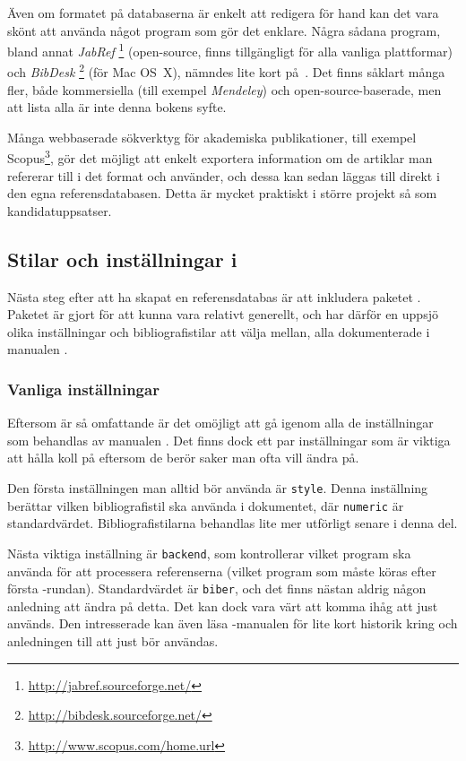 \documentclass[lang=sv,ptsize=10pt,font=none,nomath,titles=bf,../../a4.tex]{subfiles}
\begin{document}
Även om formatet på databaserna är enkelt att redigera för hand kan det
vara skönt att använda något program som gör det enklare. Några sådana
program, bland annat \emph{JabRef}%
\footnote{\url{http://jabref.sourceforge.net/}} (open-source, finns 
tillgängligt för alla vanliga plattformar) och \emph{BibDesk}%
\footnote{\url{http://bibdesk.sourceforge.net/}} (för Mac OS~X), nämndes
lite kort på~. Det finns såklart många fler, både
kommersiella (till exempel \emph{Mendeley}) och open-source-baserade, 
men att lista alla är inte denna bokens syfte.

Många webbaserade sökverktyg för akademiska publikationer, till exempel
Scopus\footnote{\url{http://www.scopus.com/home.url}}, gör det möjligt att
enkelt exportera information om de artiklar man refererar till i det
format \BibTeX{} och  använder, och dessa kan sedan
läggas till direkt i den egna referensdatabasen.
Detta är mycket praktiskt i större projekt så som kandidatuppsatser.

\subsection{Stilar och inställningar i }
Nästa steg efter att ha skapat en referensdatabas är att inkludera
paketet . Paketet är gjort för att kunna vara relativt
generellt, och har därför en uppsjö olika inställningar och
bibliografistilar att välja mellan, alla dokumenterade i manualen
\parencite{Lehman13}.

\subsubsection{Vanliga inställningar}
Eftersom  är så omfattande är det omöjligt att gå igenom
alla de inställningar som behandlas av manualen \parencite{Lehman13}. Det
finns dock ett par inställningar som är viktiga att hålla koll på eftersom
de berör saker man ofta vill ändra på.

Den första inställningen man alltid bör använda är \texttt{style}. Denna
inställning berättar vilken bibliografistil  ska använda
i dokumentet, där \texttt{numeric} är standardvärdet. Bibliografistilarna
behandlas lite mer utförligt senare i denna del.

Nästa viktiga inställning är \texttt{backend}, som kontrollerar vilket
program  ska använda för att processera referenserna
(\eg vilket program som måste köras efter första \pdfLaTeX-rundan).
Standardvärdet är \texttt{biber}, och det finns nästan aldrig någon
anledning att ändra på detta. Det kan dock vara värt att komma ihåg
att just  används. Den intresserade kan även läsa
-manualen \parencite[\ppno~3\psqq]{Kime13} för lite kort
historik kring  och anledningen till att just 
bör användas.
\end{document}
